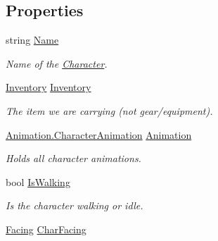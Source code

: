 \subsection*{Properties}
\begin{DoxyCompactItemize}
\item 
string \hyperlink{class_project_porcupine_1_1_entities_1_1_character_af4e554d7f9ef54371bc8b4759be5ec47}{Name}
\begin{DoxyCompactList}\small\item\em Name of the \hyperlink{class_project_porcupine_1_1_entities_1_1_character}{Character}. \end{DoxyCompactList}\item 
\hyperlink{class_inventory}{Inventory} \hyperlink{class_project_porcupine_1_1_entities_1_1_character_a051d739a9db597fbcf9b089d635467f1}{Inventory}
\begin{DoxyCompactList}\small\item\em The item we are carrying (not gear/equipment). \end{DoxyCompactList}\item 
\hyperlink{class_animation_1_1_character_animation}{Animation.\+Character\+Animation} \hyperlink{class_project_porcupine_1_1_entities_1_1_character_aaec7ff140a2e9ab0b1866fe0269e28ab}{Animation}
\begin{DoxyCompactList}\small\item\em Holds all character animations. \end{DoxyCompactList}\item 
bool \hyperlink{class_project_porcupine_1_1_entities_1_1_character_af30b174c7f2a3a97f59b5691731940b0}{Is\+Walking}
\begin{DoxyCompactList}\small\item\em Is the character walking or idle. \end{DoxyCompactList}\item 
\hyperlink{namespace_project_porcupine_1_1_entities_a91ebf8b2a3a0315adf5da6e882862808}{Facing} \hyperlink{class_project_porcupine_1_1_entities_1_1_character_a3320243dfa85049b8fa5e6e7d879280e}{Char\+Facing}

\end{DoxyCompactItemize}
